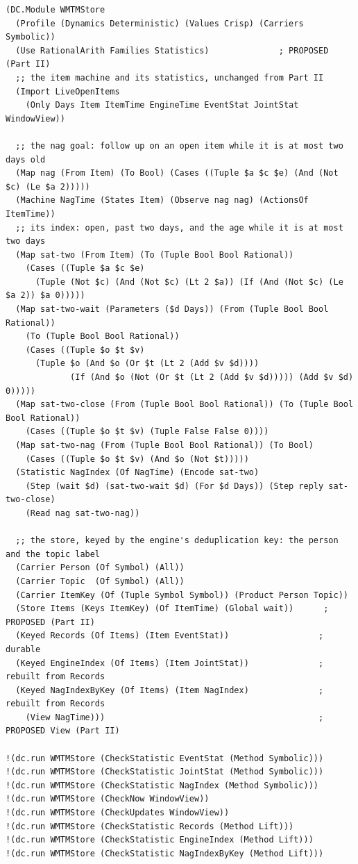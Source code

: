 \documentclass[11pt]{article}
\theoremstyle{definition}
\theoremstyle{plain}
\begin{document}
\begin{lstlisting}[style=mettamod]
(DC.Module WMTMStore
  (Profile (Dynamics Deterministic) (Values Crisp) (Carriers Symbolic))
  (Use RationalArith Families Statistics)              ; PROPOSED (Part II)
  ;; the item machine and its statistics, unchanged from Part II
  (Import LiveOpenItems
    (Only Days Item ItemTime EngineTime EventStat JointStat WindowView))

  ;; the nag goal: follow up on an open item while it is at most two days old
  (Map nag (From Item) (To Bool) (Cases ((Tuple $a $c $e) (And (Not $c) (Le $a 2)))))
  (Machine NagTime (States Item) (Observe nag nag) (ActionsOf ItemTime))
  ;; its index: open, past two days, and the age while it is at most two days
  (Map sat-two (From Item) (To (Tuple Bool Bool Rational))
    (Cases ((Tuple $a $c $e)
      (Tuple (Not $c) (And (Not $c) (Lt 2 $a)) (If (And (Not $c) (Le $a 2)) $a 0)))))
  (Map sat-two-wait (Parameters ($d Days)) (From (Tuple Bool Bool Rational))
    (To (Tuple Bool Bool Rational))
    (Cases ((Tuple $o $t $v)
      (Tuple $o (And $o (Or $t (Lt 2 (Add $v $d))))
             (If (And $o (Not (Or $t (Lt 2 (Add $v $d))))) (Add $v $d) 0)))))
  (Map sat-two-close (From (Tuple Bool Bool Rational)) (To (Tuple Bool Bool Rational))
    (Cases ((Tuple $o $t $v) (Tuple False False 0))))
  (Map sat-two-nag (From (Tuple Bool Bool Rational)) (To Bool)
    (Cases ((Tuple $o $t $v) (And $o (Not $t)))))
  (Statistic NagIndex (Of NagTime) (Encode sat-two)
    (Step (wait $d) (sat-two-wait $d) (For $d Days)) (Step reply sat-two-close)
    (Read nag sat-two-nag))

  ;; the store, keyed by the engine's deduplication key: the person and the topic label
  (Carrier Person (Of Symbol) (All))
  (Carrier Topic  (Of Symbol) (All))
  (Carrier ItemKey (Of (Tuple Symbol Symbol)) (Product Person Topic))
  (Store Items (Keys ItemKey) (Of ItemTime) (Global wait))      ; PROPOSED (Part II)
  (Keyed Records (Of Items) (Item EventStat))                  ; durable
  (Keyed EngineIndex (Of Items) (Item JointStat))              ; rebuilt from Records
  (Keyed NagIndexByKey (Of Items) (Item NagIndex)              ; rebuilt from Records
    (View NagTime)))                                           ; PROPOSED View (Part II)

!(dc.run WMTMStore (CheckStatistic EventStat (Method Symbolic)))
!(dc.run WMTMStore (CheckStatistic JointStat (Method Symbolic)))
!(dc.run WMTMStore (CheckStatistic NagIndex (Method Symbolic)))
!(dc.run WMTMStore (CheckNow WindowView))
!(dc.run WMTMStore (CheckUpdates WindowView))
!(dc.run WMTMStore (CheckStatistic Records (Method Lift)))
!(dc.run WMTMStore (CheckStatistic EngineIndex (Method Lift)))
!(dc.run WMTMStore (CheckStatistic NagIndexByKey (Method Lift)))
\end{lstlisting}
\end{document}
